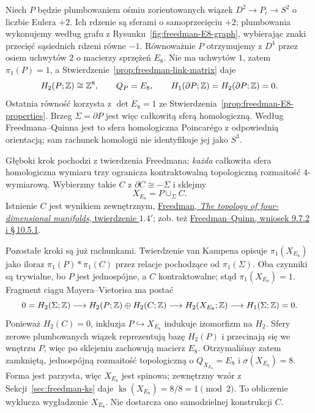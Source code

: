 \begin{przyklad}[Od plumbowania do $X_{E_8}$]
\label{prz:freedman-E8-gluing}
Niech $P$ będzie plumbowaniem ośmiu zorientowanych
wiązek $D^2\to P_i\to S^2$ o liczbie Eulera $+2$.
Ich rdzenie są sferami o samoprzecięciu $+2$;
plumbowania wykonujemy według grafu z
Rysunku~\ref{fig:freedman-E8-graph}, wybierając
znaki przecięć sąsiednich rdzeni równe $-1$.
Równoważnie $P$ otrzymujemy z $D^4$ przez osiem
uchwytów $2$ o macierzy sprzężeń $E_8$.
Nie ma uchwytów $1$, zatem $\pi_1(P)=1$, a
Stwierdzenie~\ref{prop:freedman-link-matrix} daje
\[
 H_2(P;\mathbb{Z})\cong\mathbb{Z}^8,\qquad Q_P=E_8,
 \qquad H_1(\partial P;\mathbb{Z})=H_2(\partial P;\mathbb{Z})=0.
\]
Ostatnia równość korzysta z
$\det E_8=1$ ze Stwierdzenia~\ref{prop:freedman-E8-properties}.
Brzeg $\Sigma=\partial P$ jest więc całkowitą
sferą homologiczną. Według Freedmana--Quinna jest
to sfera homologiczna Poincarégo z odpowiednią
orientacją; sam rachunek homologii nie identyfikuje
jej jako $S^3$.

Głęboki krok pochodzi z twierdzenia Freedmana:
\emph{każda} całkowita sfera homologiczna wymiaru
trzy ogranicza kontraktowalną topologiczną
rozmaitość $4$-wymiarową. Wybierzmy takie $C$
z $\partial C\cong-\Sigma$ i sklejmy
\[
 X_{E_8}=P\cup_{\Sigma}C.
\]
Istnienie $C$ jest wynikiem zewnętrznym,
\href{https://www.maths.gla.ac.uk/~mpowell/1982_The%20topology%20of%20four-dimensional%20manifolds.pdf}
{Freedman, \emph{The topology of four-dimensional
manifolds}, twierdzenie $1.4'$}; zob. też
\href{https://archive.mpim-bonn.mpg.de/4789/2/FreedmanQuinn-TopologyOf4Manifolds-Reformatted2013.pdf}
{Freedman--Quinn, wniosek 9.7.2 i \S\,10.5.1}.

Pozostałe kroki są już rachunkami. Twierdzenie
van Kampena opisuje $\pi_1(X_{E_8})$ jako iloraz
$\pi_1(P)*\pi_1(C)$ przez relacje pochodzące od
$\pi_1(\Sigma)$. Oba czynniki są trywialne, bo
$P$ jest jednospójne, a $C$ kontraktowalne;
stąd $\pi_1(X_{E_8})=1$.
Fragment ciągu Mayera--Vietorisa ma postać
\[
 0=H_2(\Sigma;\mathbb{Z})\longrightarrow
 H_2(P;\mathbb{Z})\oplus H_2(C;\mathbb{Z})
 \longrightarrow H_2(X_{E_8};\mathbb{Z})
 \longrightarrow H_1(\Sigma;\mathbb{Z})=0.
\]
Ponieważ $H_2(C)=0$, inkluzja $P\hookrightarrow X_{E_8}$
indukuje izomorfizm na $H_2$. Sfery zerowe
plumbowanych wiązek reprezentują bazę $H_2(P)$
i przecinają się we wnętrzu $P$, więc po sklejeniu
zachowują macierz $E_8$. Otrzymaliśmy zatem
zamkniętą, jednospójną rozmaitość topologiczną
o $Q_{X_{E_8}}=E_8$ i $\sigma(X_{E_8})=8$.
Forma jest parzysta, więc $X_{E_8}$ jest spinowa;
zewnętrzny wzór z Sekcji~\ref{sec:freedman-ks}
daje $\operatorname{ks}(X_{E_8})=8/8=1\pmod2$.
To obliczenie wyklucza wygładzenie $X_{E_8}$.
Nie dostarcza ono samodzielnej konstrukcji $C$.
\end{przyklad}

